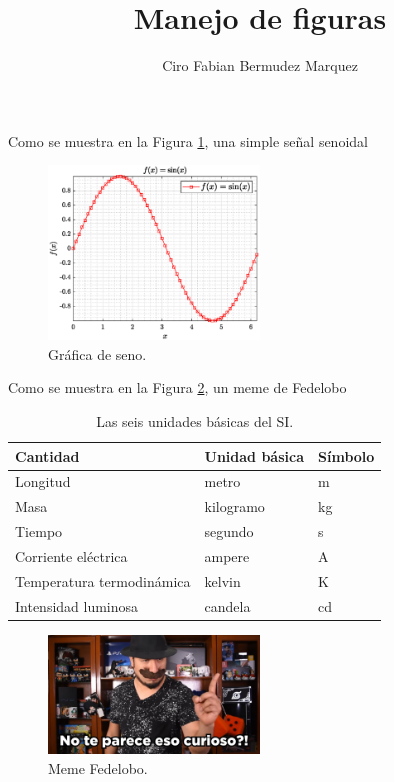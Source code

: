 \documentclass[10pt,a4paper]{article}
\author{Ciro Fabian Bermudez Marquez}
\title{Manejo de figuras}
\begin{document}
\maketitle

\lipsum[1-2]

Como se muestra en la Figura \ref{fig:a2_grafica_seno}, una simple señal senoidal

\begin{figure}[hbtp]
\centering
\includegraphics[width=0.5\textwidth]{imagenes/a2_grafica_seno.eps}
\caption{Gráfica de seno.}
\label{fig:a2_grafica_seno}
\end{figure}



Como se muestra en la Figura \ref{fig:a1_meme_fedelobo}, un meme de Fedelobo

	\begin{table}[!hbp]
		\centering
		\begin{tabular}{l  l  l}
			\textbf{Cantidad} &  \textbf{Unidad básica} & \textbf{Símbolo}\\
			\hline
			Longitud 					& metro 		& m		\\
			Masa 						& kilogramo 	& kg	\\
			Tiempo 						& segundo 		& s		\\
			Corriente eléctrica 		& ampere 		& A		\\
			Temperatura termodinámica 	& kelvin 		& K		\\
			Intensidad luminosa 		& candela 		& cd	\\
			\hline
		\end{tabular}
		\caption{Las seis unidades básicas del SI.}
		\label{tab:unidades}
	\end{table}
	


\begin{figure}[hbtp]
\centering
\includegraphics[width=0.5\textwidth]{imagenes/a1_meme_fedelobo.jpg}
\caption{Meme Fedelobo.}
\label{fig:a1_meme_fedelobo}
\end{figure}








	
\end{document}
